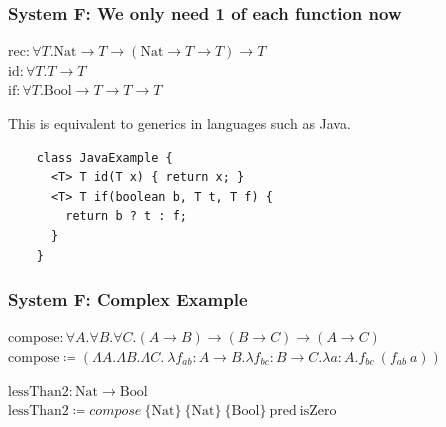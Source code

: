 \documentclass{beamer}
\newcommand{\bool}{\text{Bool}}
\newcommand{\nat}{\text{Nat}}
\begin{document}
\begin{frame}[fragile]
  \frametitle{System F: We only need 1 of each function now}

   $\text{rec} : \forall T . \nat \rightarrow T \rightarrow (\nat \rightarrow T \rightarrow T) \rightarrow T$ \\

  $\text{id} : \forall T . T \rightarrow T$ \\

  $\text{if} : \forall T . \bool \rightarrow T \rightarrow T \rightarrow T$ \\

  \vspace{5mm}

  This is equivalent to generics in languages such as Java.

  \begin{lstlisting}
    class JavaExample {
      <T> T id(T x) { return x; }
      <T> T if(boolean b, T t, T f) {
        return b ? t : f;
      }
    }
  \end{lstlisting}
\end{frame}

\begin{frame}[fragile]
  \frametitle{System F: Complex Example}

  $\text{compose} : \forall A . \forall B . \forall C . (A \rightarrow B) \rightarrow (B \rightarrow C) \rightarrow (A \rightarrow C)$ \\
  $\text{compose} \coloneqq (\Lambda A . \Lambda B . \Lambda C . \ \lambda f_{ab} : A \rightarrow B . \lambda f_{bc} : B \rightarrow C . \lambda a: A . f_{bc}\ (f_{ab}\ a))$ \\

  \vspace{5mm}

  $\text{lessThan2} : \nat \rightarrow \bool$ \\
  $\text{lessThan2} \coloneqq compose\ \{\nat\}\ \{\nat\}\ \{\bool\}\ \text{pred}\ \text{isZero}$

\end{frame}
\end{document}
